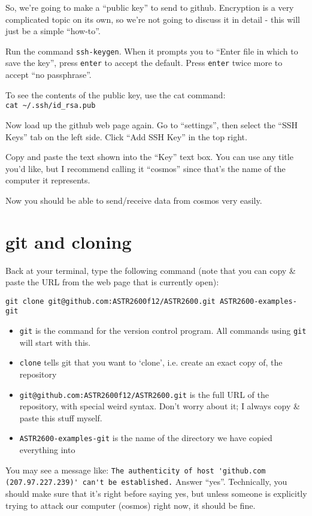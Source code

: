 \documentclass{article}
\begin{document}
\begin{spacing}{1.0}
So, we're going to make a ``public key'' to send to github.  Encryption is a very complicated
topic on its own, so we're not going to discuss it in detail - this will just be a simple
``how-to''.

Run the command \verb|ssh-keygen|.  When it prompts you to ``Enter file in
which to save the key'', press \texttt{enter} to accept the default.  Press
\texttt{enter} twice more to accept ``no passphrase''.

To see the contents of the public key, use the cat command:\\
\verb|cat ~/.ssh/id_rsa.pub|

Now load up the github web page again.  Go to ``settings'', then select the
``SSH Keys'' tab on the left side.  Click ``Add SSH Key'' in the top right.

Copy and paste the text shown into the ``Key'' text box.  You can use any title
you'd like, but I recommend calling it ``cosmos'' since that's the name of the
computer it represents.

Now you should be able to send/receive data from cosmos very easily.

\section{git and cloning}

Back at your terminal, type the following command (note that you can copy \&
paste the URL from the web page that is currently open):

\verb|git clone git@github.com:ASTR2600f12/ASTR2600.git ASTR2600-examples-git|

\begin{itemize}
    \item \texttt{git} is the command for the version control program.  All commands
        using \texttt{git} will start with this.
    \item \texttt{clone} tells git that you want to `clone', i.e. create an
        exact copy of, the repository
    \item \texttt{git@github.com:ASTR2600f12/ASTR2600.git} is the full URL of
        the repository, with special weird syntax.  Don't worry about it; I
        always copy \& paste this stuff myself.
    \item \texttt{ASTR2600-examples-git} is the name of the directory we have copied everything into
\end{itemize}

You may see a message like:
\verb|The authenticity of host 'github.com (207.97.227.239)' can't be established.|
Answer “yes”.  Technically, you should make sure that it's right before saying
yes, but unless someone is explicitly trying to attack our computer (cosmos) right now,
it should be fine.


\end{spacing}
\end{document}

